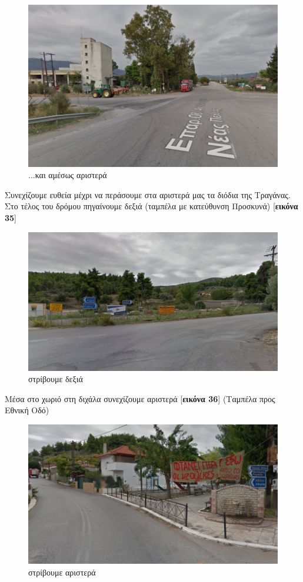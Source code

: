 \begin{figure}[H]
\includegraphics[width=\textwidth]{images/lamia-athina/tragana/tragana_010.jpg} 
\caption{...και αμέσως αριστερά}
\end{figure}
Συνεχίζουμε ευθεία μέχρι να περάσουμε στα αριστερά μας τα διόδια της Τραγάνας. Στο τέλος του δρόμου πηγαίνουμε δεξιά (ταμπέλα με κατεύθυνση Προσκυνά) [\textbf{εικόνα 35}]
\begin{figure}[H]
\includegraphics[width=\textwidth]{images/lamia-athina/tragana/tragana_011.jpg} 
\caption{στρίβουμε δεξιά}
\end{figure}
Μέσα στο χωριό στη διχάλα συνεχίζουμε αριστερά [\textbf{εικόνα 36}] (Ταμπέλα προς Εθνική Οδό)
\begin{figure}[H]
\includegraphics[width=\textwidth]{images/lamia-athina/tragana/tragana_012.jpg} 
\caption{στρίβουμε αριστερά}
\end{figure}
